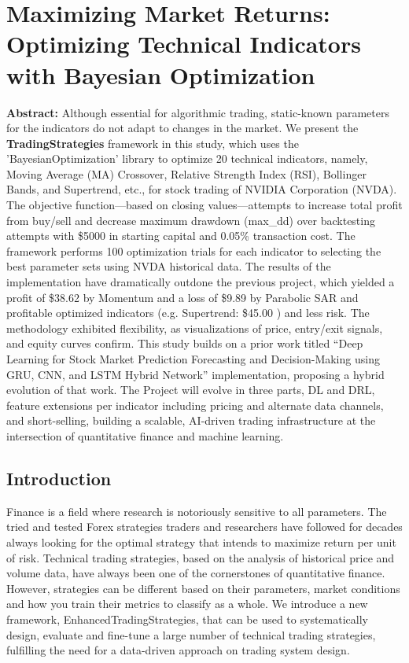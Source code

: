 \chapter{Maximizing Market Returns: Optimizing Technical Indicators with Bayesian Optimization}

\textbf{Abstract:} Although essential for algorithmic trading, static-known parameters for the indicators do not adapt to changes in the market. We present the \textbf{TradingStrategies} framework in this study, which uses the 'BayesianOptimization' library to optimize 20 technical indicators, namely, Moving Average (MA) Crossover, Relative Strength Index (RSI), Bollinger Bands, and Supertrend, etc., for stock trading of NVIDIA Corporation (NVDA).  The objective function—based on closing values—attempts to increase total profit from buy/sell and decrease maximum drawdown (max\_dd) over backtesting attempts with \$5000 in starting capital and 0.05\% transaction cost. The framework performs 100 optimization trials for each indicator to selecting the best parameter sets using NVDA historical data. The results of the implementation have dramatically outdone the previous project, which yielded a profit of \$38.62 by Momentum and a loss of \$9.89 by Parabolic SAR and profitable optimized indicators (e.g. Supertrend: \$45.00 ) and less risk. The methodology exhibited flexibility, as visualizations of price, entry/exit signals, and equity curves confirm. This study builds on a prior work titled “Deep Learning for Stock Market Prediction\: Forecasting and Decision-Making using GRU, CNN, and LSTM Hybrid Network” implementation, proposing a hybrid evolution of that work. The Project will evolve in three parts, DL and DRL, feature extensions per indicator including pricing and alternate data channels, and short-selling, building a scalable, AI-driven trading infrastructure at the intersection of quantitative finance and machine learning.

\section{Introduction}
Finance is a field where research is notoriously sensitive to all parameters. The tried and tested Forex strategies traders and researchers have followed for decades always looking for the optimal strategy that intends to maximize return per unit of risk. Technical trading strategies, based on the analysis of historical price and volume data, have always been one of the cornerstones of quantitative finance. However, strategies can be different based on their parameters, market conditions and how you train their metrics to classify as a whole. We introduce a new framework, EnhancedTradingStrategies, that can be used to systematically design, evaluate and fine-tune a large number of technical trading strategies, fulfilling the need for a data-driven approach on trading system design.

